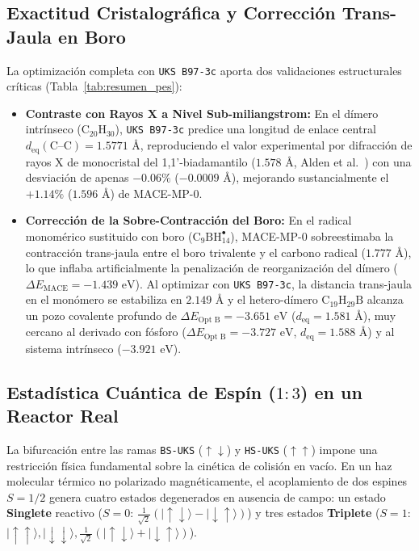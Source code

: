 \documentclass[10pt,twocolumn,a4paper]{article}
\begin{document}
\subsection{Exactitud Cristalográfica y Corrección Trans-Jaula en Boro}
La optimización completa con \texttt{UKS B97-3c} aporta dos validaciones estructurales críticas (Tabla~\ref{tab:resumen_pes}):
\begin{itemize}
    \item \textbf{Contraste con Rayos X a Nivel Sub-miliangstrom:} En el dímero intrínseco ($\text{C}_{20}\text{H}_{30}$), \texttt{UKS B97-3c} predice una longitud de enlace central $d_{\text{eq}}(\text{C--C}) = 1.5771\text{ \AA}$, reproduciendo el valor experimental por difracción de rayos X de monocristal del 1,1'-biadamantilo ($1.578\text{ \AA}$, Alden et al.\ \cite{Alden1968}) con una desviación de apenas $\mathbf{-0.06\%}$ ($-0.0009\text{ \AA}$), mejorando sustancialmente el $+1.14\%$ ($1.596\text{ \AA}$) de MACE-MP-0.
    \item \textbf{Corrección de la Sobre-Contracción del Boro:} En el radical monomérico sustituido con boro ($\text{C}_9\text{BH}_{14}^\bullet$), MACE-MP-0 sobreestimaba la contracción trans-jaula entre el boro trivalente y el carbono radical ($1.777\text{ \AA}$), lo que inflaba artificialmente la penalización de reorganización del dímero ($\Delta E_{\text{MACE}} = -1.439\text{ eV}$). Al optimizar con \texttt{UKS B97-3c}, la distancia trans-jaula en el monómero se estabiliza en $2.149\text{ \AA}$ y el hetero-dímero $\text{C}_{19}\text{H}_{29}\text{B}$ alcanza un pozo covalente profundo de $\Delta E_{\text{Opt B}} = -3.651\text{ eV}$ ($d_{\text{eq}} = 1.581\text{ \AA}$), muy cercano al derivado con fósforo ($\Delta E_{\text{Opt B}} = -3.727\text{ eV}$, $d_{\text{eq}} = 1.588\text{ \AA}$) y al sistema intrínseco ($-3.921\text{ eV}$).
\end{itemize}

\subsection{Estadística Cuántica de Espín ($1:3$) en un Reactor Real}
La bifurcación entre las ramas \texttt{BS-UKS} ($\uparrow\downarrow$) y \texttt{HS-UKS} ($\uparrow\uparrow$) impone una restricción física fundamental sobre la cinética de colisión en vacío. En un haz molecular térmico no polarizado magnéticamente, el acoplamiento de dos espines $S=1/2$ genera cuatro estados degenerados en ausencia de campo: un estado \textbf{Singlete} reactivo ($S=0$: $\frac{1}{\sqrt{2}}(\lvert\uparrow\downarrow\rangle - \lvert\downarrow\uparrow\rangle)$) y tres estados \textbf{Triplete} ($S=1$: $\lvert\uparrow\uparrow\rangle, \lvert\downarrow\downarrow\rangle, \frac{1}{\sqrt{2}}(\lvert\uparrow\downarrow\rangle + \lvert\downarrow\uparrow\rangle)$).
\end{document}
